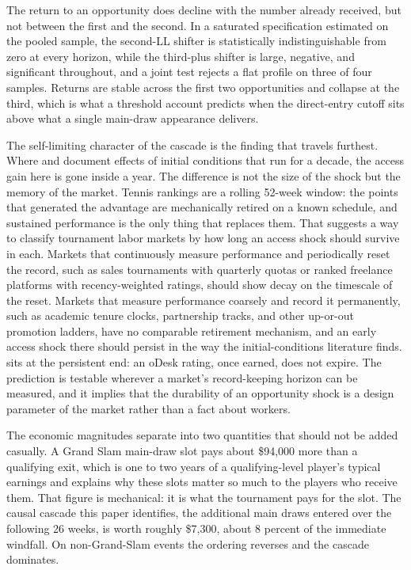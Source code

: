 The return to an opportunity does decline with the number already received, but not between the first and the second. In a saturated specification estimated on the pooled sample, the second-LL shifter is statistically indistinguishable from zero at every horizon, while the third-plus shifter is large, negative, and significant throughout, and a joint test rejects a flat profile on three of four samples. Returns are stable across the first two opportunities and collapse at the third, which is what a threshold account predicts when the direct-entry cutoff sits above what a single main-draw appearance delivers.

The self-limiting character of the cascade is the finding that travels furthest. Where \citet{Oyer2006_initial_placement} and \citet{Oreopoulos2012_graduating_recession} document effects of initial conditions that run for a decade, the access gain here is gone inside a year. The difference is not the size of the shock but the memory of the market. Tennis rankings are a rolling 52-week window: the points that generated the advantage are mechanically retired on a known schedule, and sustained performance is the only thing that replaces them. That suggests a way to classify tournament labor markets by how long an access shock should survive in each. Markets that continuously measure performance and periodically reset the record, such as sales tournaments with quarterly quotas or ranked freelance platforms with recency-weighted ratings, should show decay on the timescale of the reset. Markets that measure performance coarsely and record it permanently, such as academic tenure clocks, partnership tracks, and other up-or-out promotion ladders, have no comparable retirement mechanism, and an early access shock there should persist in the way the initial-conditions literature finds. \citet{Pallais2014_inefficient_hiring} sits at the persistent end: an oDesk rating, once earned, does not expire. The prediction is testable wherever a market's record-keeping horizon can be measured, and it implies that the durability of an opportunity shock is a design parameter of the market rather than a fact about workers.

The economic magnitudes separate into two quantities that should not be added casually. A Grand Slam main-draw slot pays about \$94{,}000 more than a qualifying exit, which is one to two years of a qualifying-level player's typical earnings and explains why these slots matter so much to the players who receive them. That figure is mechanical: it is what the tournament pays for the slot. The causal cascade this paper identifies, the additional main draws entered over the following 26 weeks, is worth roughly \$7{,}300, about 8 percent of the immediate windfall. On non-Grand-Slam events the ordering reverses and the cascade dominates.

